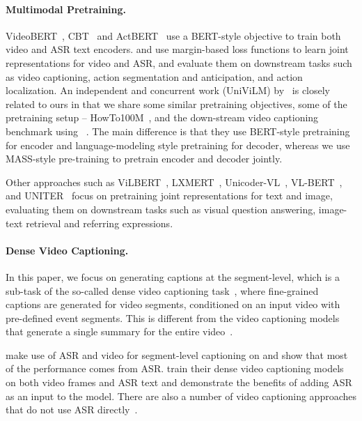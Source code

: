 \documentclass[11pt,a4paper]{article}
\begin{document}
\paragraph{Multimodal Pretraining.} 
VideoBERT~\cite{sun2019videobert}, CBT~\cite{sun2019contrastive} and ActBERT~\cite{actbert2020cvpr} use a BERT-style objective to train both video and ASR text encoders. \citet{Alayrac2016cvpr} and \citet{Miech2020cvpr} use margin-based loss functions to learn joint representations for video and ASR, and evaluate them on downstream tasks such as video captioning, action segmentation and anticipation, and action localization. 
An independent and concurrent work (UniViLM) by~\citet{luo2020univilm} is closely related to ours in that we share some similar pretraining objectives, some of the pretraining setup -- HowTo100M~\cite{Alayrac2016cvpr}, and the down-stream video captioning benchmark using \youcook~\cite{zhou2018towards}. 
The main difference is that they use BERT-style pretraining for encoder and language-modeling style pretraining for decoder, whereas we use MASS-style pre-training to pretrain encoder and decoder jointly.

Other approaches such as ViLBERT~\citep{lu2019vilbert}, LXMERT~\citep{tan2019lxmert}, Unicoder-VL~\citep{li2019unicoder}, VL-BERT~\citep{su2019vl}, and UNITER~\citep{chen2019uniter} focus on pretraining joint representations for text and image, evaluating them on downstream tasks such as visual question answering, image-text retrieval and referring expressions.

\paragraph{Dense Video Captioning.} 
In this paper, we focus on generating captions at the segment-level, which is a sub-task of the so-called dense video captioning task~\cite{krishna2017densecaptioning}, where fine-grained captions are generated for video segments, conditioned on an input video with pre-defined event segments. This is different from the video captioning models that generate a single summary for the entire video~\cite{Wang2019VaTeXAL}.

\citet{hessel2019case} make use of ASR and video for segment-level captioning on \youcook and show that most of the performance comes from ASR. \citet{shi2019dense,luo2020univilm} train their dense video captioning models on both video frames and ASR text and demonstrate the benefits of adding ASR as an input to the model. There are also a number of video captioning approaches that do not use ASR directly~\cite{Zhou2018EndtoEndDV, pan2020cvpr, zheng2020cvpr, zhang2020cvpr, Lei2020MARTMR}.
\end{document}
